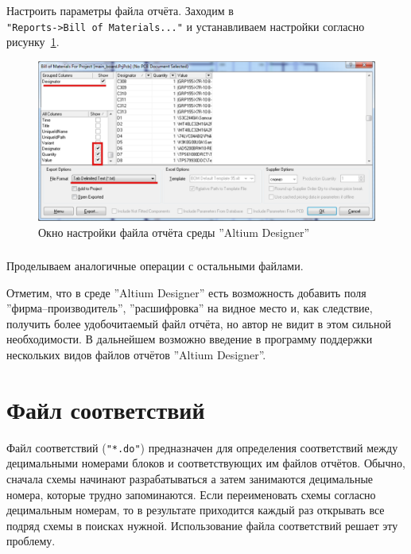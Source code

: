 \newpage
\subsubsection{}Настроить параметры файла отчёта. Заходим в \\ \verb|"Reports->Bill of Materials..."|
и устанавливаем настройки согласно рисунку~\ref{p:pic_ad_bom_creater_window}.

\begin{figure}[H]\center
  \includegraphics[width=1\textwidth]{VP_auto/pictures/ad/pic_ad_bom_creater_window}
  \caption{Окно настройки файла отчёта среды ''Altium Designer''} \label{p:pic_ad_bom_creater_window}
\end{figure}

\subsubsection{}Проделываем аналогичные операции с остальными файлами.

Отметим, что в среде ''Altium Designer'' есть возможность добавить поля \\''фирма--производитель'', ''расшифровка'' на видное место и,
как следствие, получить более удобочитаемый файл отчёта, но автор не видит в этом сильной необходимости. В дальнейшем возможно введение в программу поддержки нескольких видов файлов отчётов ''Altium Designer''.







\section{Файл соответствий}\label{sec:detimal} 

Файл соответствий (\verb|"*.do"|) предназначен для определения соответствий между децимальными номерами блоков и соответствующих им файлов отчётов. Обычно, сначала схемы начинают разрабатываться а затем занимаются децимальные номера, которые трудно запоминаются. Если переименовать схемы согласно децимальным номерам, то в результате приходится каждый раз открывать все подряд схемы в поисках нужной. Использование файла соответствий решает эту проблему.

